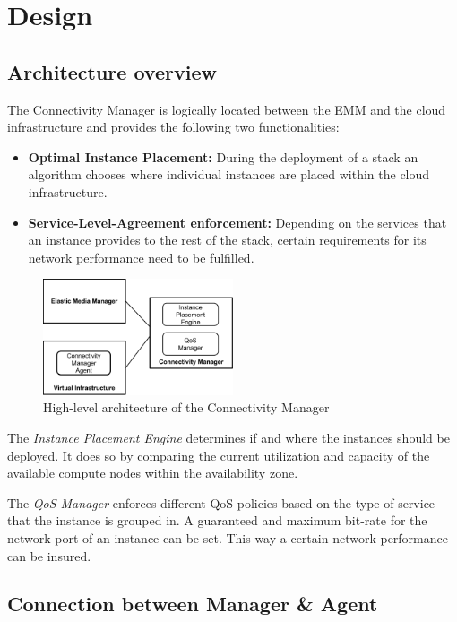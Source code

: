 \chapter{Design}

\section{Architecture overview}

The Connectivity Manager is logically located between the EMM and the cloud infrastructure and provides the following two functionalities:
\begin{itemize}
\item \textbf{Optimal Instance Placement:} During the deployment of a stack an algorithm chooses where individual instances are placed within the cloud infrastructure.
\item \textbf{Service-Level-Agreement enforcement:} Depending on the services that an instance provides to the rest of the stack, certain requirements for its network performance need to be fulfilled.
\end{itemize}

\begin{figure}[H]
\centering

\includegraphics[width=0.5\textwidth]{images/design/functional_architecture}

\caption{High-level architecture of the Connectivity Manager}
\end{figure}

The \textit{Instance Placement Engine} determines if and where the instances should be deployed. It does so by comparing the current utilization and capacity of the available compute nodes within the availability zone.

The \textit{QoS Manager} enforces different QoS policies based on the type of service that the instance is grouped in. A guaranteed and maximum bit-rate for the network port of an instance can be set. This way a certain network performance can be insured.

\section{Connection between Manager \& Agent}

